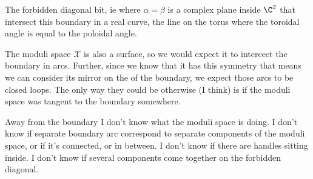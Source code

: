 The forbidden diagonal bit, ie where $α=β$ is a complex plane inside $\C^2$ that intersect this boundary in a real curve, the line on the torus where the toroidal angle is equal to the poloidal angle.

The moduli space $\mathcal{X}$ is also a surface, so we would expect it to intercect the boundary in arcs. Further, since we know that it has this symmetry that means we can consider its mirror on the of the boundary, we expect those arcs to be closed loops. The only way they could be otherwise (I think) is if the moduli space was tangent to the boundary somewhere.

Away from the boundary I don't know what the moduli space is doing. I don't know if separate boundary arc correspond to separate components of the moduli space, or if it's connected, or in between. I don't know if there are handles sitting inside. I don't know if several components come together on the forbidden diagonal.


